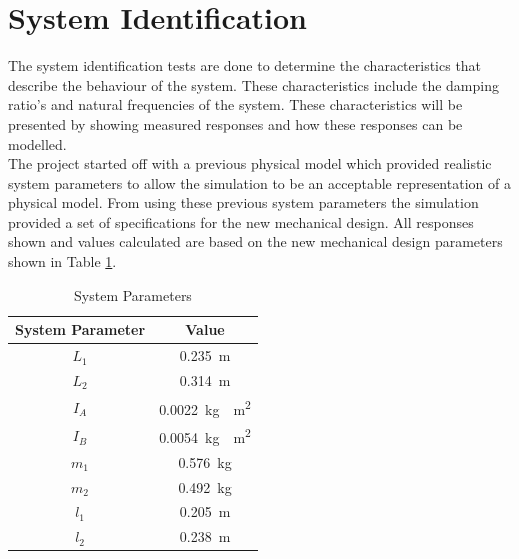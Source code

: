 \section{System Identification}
\label{sec:system_identification}

The system identification tests are done to determine the characteristics that describe the behaviour of the system. These characteristics include the damping ratio's and natural frequencies of the system. These characteristics will be presented by showing measured responses and how these responses can be modelled. \\

The project started off with a previous physical model which provided realistic system parameters to allow the simulation to be an acceptable representation of a physical model. From using these previous system parameters the simulation provided a set of specifications for the new mechanical design. All responses shown and values calculated are based on the new mechanical design parameters shown in Table \ref{table:system_param}.\\


		\begin{table}[]
	\centering
	\begin{tabular}{|c|c|}
		\hline
		System Parameter & Value \\
		\hline
		\hline
		$L_{1}$ & \SI{0.235}{m} \\
		\hline
		$L_{2}$ & \SI{0.314}{m} \\ 
		\hline
		$I_{A}$ & \SI{ 0.0022}{kg\cdot m^2}\\
		\hline
		$I_{B}$ & \SI{0.0054}{kg\cdot m^2}\\
		\hline
		$m_{1}$ & \SI{0.576}{kg}\\
		\hline
		$m_{2}$ & \SI{0.492}{kg} \\
		\hline
		$l_{1}$ & \SI{0.205}{m}\\
		\hline
		$l_{2}$ & \SI{0.238}{m}\\
		\hline
	\end{tabular}
	\caption{System Parameters}
	\label{table:system_param}
\end{table}



